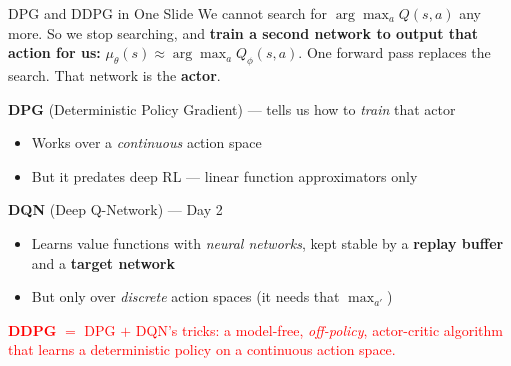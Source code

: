 
\begin{frame}{DPG and DDPG in One Slide}
\vspace{0.3em}
We cannot search for $\arg\max_a Q(s,a)$ any more. So we stop searching, and
\textbf{train a second network to output that action for us:} $\mu_\theta(s) \approx \arg\max_a Q_\phi(s,a)$. One forward pass replaces the search. That network is the \textbf{actor}.
\vspace{0.7em}
\pause

\textbf{DPG} (Deterministic Policy Gradient)  --- tells us how to \emph{train} that actor
\begin{itemize}
    \item[--] Works over a \emph{continuous} action space
    \item[--] But it predates deep RL --- linear function approximators only
\end{itemize}
\pause
\vspace{0.6em}
\textbf{DQN} (Deep Q-Network)  --- Day 2
\begin{itemize}
    \item[--] Learns value functions with \emph{neural networks}, kept stable by a \textbf{replay buffer} and a \textbf{target network}
    \item[--] But only over \emph{discrete} action spaces (it needs that $\max_{a'}$)
\end{itemize}
\pause
\vspace{0.7em}
\begin{center}
\textcolor{red}{\textbf{DDPG}  $=$ DPG $+$ DQN's tricks: a model-free, \emph{off-policy}, actor-critic algorithm\\ that learns a deterministic policy on a continuous action space.}
\end{center}
\end{frame}
